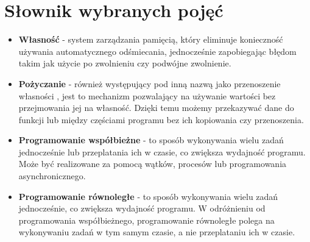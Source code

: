 \newpage
\section{Słownik wybranych pojęć}

\begin{itemize}
    \item \textbf{Własność } - system zarządzania pamięcią, który eliminuje konieczność używania automatycznego odśmiecania, jednocześnie zapobiegając błędom takim jak użycie po zwolnieniu czy podwójne zwolnienie.


    \item \textbf{Pożyczanie } - również występujący pod inną nazwą jako przenoszenie własności \cite{rustPolishNames}, jest to mechanizm pozwalający na używanie wartości bez przejmowania jej na własność. Dzięki temu możemy przekazywać dane do funkcji lub między częściami programu bez ich kopiowania czy przenoszenia.
    
    \item \textbf{Programowanie współbieżne} -  to sposób wykonywania wielu zadań jednocześnie lub przeplatania ich w czasie, co zwiększa wydajność programu. Może być realizowane za pomocą wątków, procesów lub programowania asynchronicznego.
    
    \item \textbf{Programowanie równoległe} - to sposób wykonywania wielu zadań jednocześnie, co zwiększa wydajność programu. W odróżnieniu od programowania współbieżnego, programowanie równoległe polega na wykonywaniu zadań w tym samym czasie, a nie przeplataniu ich w czasie.
    

\end{itemize}
